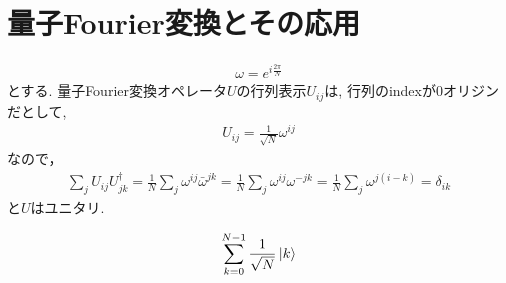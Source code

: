 \chapter{量子Fourier変換とその応用}

\begin{ex}
    \label{ex5.1}
    \begin{align*}
        \omega = e^{ i \frac{2 \pi}{N}}
    \end{align*}
    とする.
    量子Fourier変換オペレータ$U$の行列表示$U_{ij}$は, 行列のindexが0オリジンだとして,
    \begin{align*}
        U_{ij} = \frac{1}{\sqrt{N}}\omega^{ij}
    \end{align*}
    なので，
    \begin{align*}
        \sum_{j} U_{ij} U^\dagger_{jk}
        =　\frac{1}{N} \sum_j \omega^{ij} \bar{\omega}^{jk}
        = \frac{1}{N} \sum_j \omega^{ij} \omega^{-jk}
        = \frac{1}{N} \sum_j \omega^{j(i-k)}
        = \delta_{ik}
    \end{align*}
    と$U$はユニタリ.
\end{ex}


\begin{ex}
    \label{ex5.2}
    \begin{align*}
        \sum_{k=0}^{N-1} \frac{1}{\sqrt{N}} \ket{k}
    \end{align*}
\end{ex}


